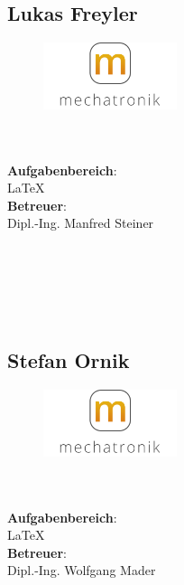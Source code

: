 \subsection*{Lukas Freyler}
\begin{figure}
\begin{center}
  \includegraphics[width=0.35\textwidth]{fig/logoMecha}
\end{center}
\end{figure}
\mbox{}\\
\mbox{}\\
\textbf{Aufgabenbereich}:\\
\LaTeX{}\\
\textbf{Betreuer}:\\
Dipl.-Ing. Manfred Steiner
\mbox{}\\
\mbox{}\\
\mbox{}\\
\mbox{}\\
\mbox{}\\
\mbox{}\\

\subsection*{Stefan Ornik}
\begin{figure}
\begin{center}
  \includegraphics[width=0.35\textwidth]{fig/logoMecha}
\end{center}
\end{figure}
\mbox{}\\
\mbox{}\\
\textbf{Aufgabenbereich}:\\
\LaTeX{}\\
\textbf{Betreuer}:\\
Dipl.-Ing. Wolfgang Mader
\mbox{}\\
\mbox{}\\
\mbox{}\\
\mbox{}\\
\mbox{}\\
\newpage

